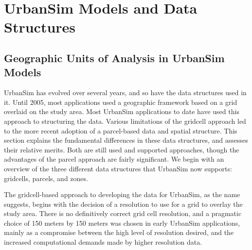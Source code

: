 \chapter{UrbanSim Models and Data Structures}

\section{Geographic Units of Analysis in UrbanSim Models}
UrbanSim has evolved over several years, and so have the data
structures used in it.  Until 2005, most applications used a geographic framework based on a grid overlaid on the study area.  Most UrbanSim applications to date have used this approach to structuring the data.  Various limitations of the gridcell approach led to the more recent adoption of a parcel-based data and spatial structure.  This section explains the fundamental differences in these data structures, and assesses their relative merits.  Both are still used and supported approaches, though the advantages of the parcel approach are fairly significant.  We begin with an overview of the three different data structures that UrbanSim now supports: gridcells, parcels, and zones.




The gridcell-based approach to developing the data for UrbanSim, as the name suggests, begins with the decision of a resolution to use for a grid to overlay the study area.  There is no definitively correct grid cell resolution, and a pragmatic choice of 150 meters by 150 meters was chosen in early UrbanSim
applications, mainly as a compromise between the high level of resolution desired, and the increased computational demands made by higher resolution data.


